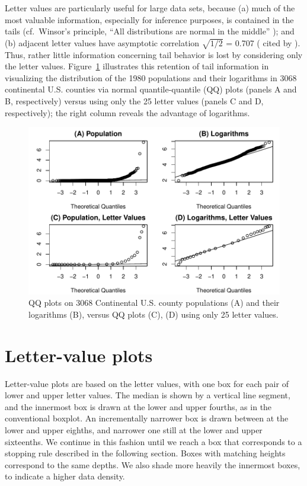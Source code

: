 \documentclass[12pt,oneside]{article}
\begin{document}
Letter values are particularly useful for large data sets, because (a) much of the most valuable information, especially for inference purposes, is contained in the tails (cf.\ Winsor's principle, ``All distributions are normal in the middle'' \citep[pg. 457]{tukey60}); and (b) adjacent letter values have asymptotic correlation $\sqrt{1/2}$ = 0.707 (\citet{mosteller46} cited by \citet[pg. 51--52]{dchlv}). Thus, rather little information concerning tail behavior is lost by considering only the letter values. Figure~\ref{qqpop4} illustrates this retention of tail information in visualizing the distribution of the 1980 populations and their logarithms in 3068 continental U.S. counties via normal quantile-quantile (QQ) plots (panels A and B, respectively) versus using only the 25 letter values (panels C and D, respectively); the right column reveals the advantage of logarithms.

\begin{figure}[hbtp]
  \centering
  \includegraphics[width = 0.75 \linewidth]{counties-qq}

  \caption{QQ plots on 3068 Continental U.S. county populations (A) and their
  logarithms (B), versus QQ plots (C), (D) using only 25 letter values.}
  \label{qqpop4}
\end{figure}

\section{Letter-value plots}
\label{sec:lv-boxplots}

Letter-value plots are based on the letter values, with one box for each pair of lower and upper letter values. The median is shown by a vertical line segment, and the innermost box is drawn at the lower and upper fourths, as in the conventional boxplot. An incrementally narrower box is drawn between at the lower and upper eighths, and narrower one still at the lower and upper sixteenths. We continue in this fashion until we reach a box that corresponds to a stopping rule described in the following section. Boxes with matching heights correspond to the same depths. We also shade more heavily the innermost boxes, to indicate a higher data density.
\end{document}
